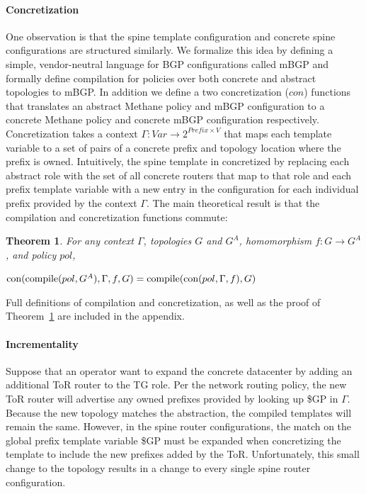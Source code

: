 \documentclass[numbers, 10pt, preprint]{sigplanconf}
\newcommand{\sysname}{{\small \sf Methane}\xspace}
\newcommand{\mbgp}{{\small \sf mBGP}\xspace}
\newcommand{\para}[1]{\paragraph*{\textbf{#1}}}
\newtheorem{thm}{Theorem}[section]
\begin{document}
\para{Concretization}

One observation is that the spine template configuration and concrete spine configurations are structured similarly. We formalize this idea by defining a simple, vendor-neutral language for BGP configurations called \mbgp and formally define compilation for policies over both concrete and abstract topologies to \mbgp. In addition we define a two concretization ($con$) functions that translates an abstract \sysname policy and \mbgp configuration to a concrete \sysname policy and concrete \mbgp configuration respectively. Concretization takes a context $\Gamma : \mathit{Var} \rightarrow 2^{\mathit{Prefix} \times V}$ that maps each template variable to a set of pairs of a concrete prefix and topology location where the prefix is owned. Intuitively, the spine template in concretized by replacing each abstract role with the set of all concrete routers that map to that role and each prefix template variable with a new entry in the configuration for each individual prefix provided by the context $\Gamma$.
The main theoretical result is that the compilation and concretization functions commute:


\begin{thm}
  For any context $\Gamma$, topologies $G$ and $G^A$, homomorphism $f : G \rightarrow G^A$, and policy $pol$,

  \vspace{1em}
  \noindent
  $\text{con}(\text{compile}(pol,G^A), \Gamma,f,G) = \text{compile}(\text{con}(pol,\Gamma,f),G)$
  \label{thm:concretization}
\end{thm}
%
\vspace{-.8em}
Full definitions of compilation and concretization, as well as the proof of Theorem~\ref{thm:concretization} are included in the appendix.


\para{Incrementality}

Suppose that an operator want to expand the concrete datacenter by adding an additional ToR router to the TG role. Per the network routing policy, the new ToR router will advertise any owned prefixes provided by looking up {\small \$GP} in $\Gamma$. Because the new topology matches the abstraction, the compiled templates will remain the same. However, in the spine router configurations, the match on the global prefix template variable {\small \$GP} must be expanded when concretizing the template to include the new prefixes added by the ToR. Unfortunately, this small change to the topology results in a change to every single spine router configuration.
\end{document}
